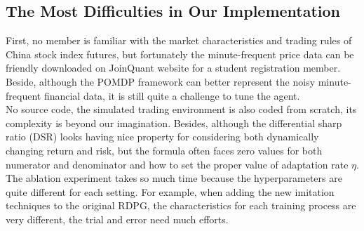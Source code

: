\subsection{The Most Difficulties in Our Implementation}
First, no member is familiar with the market characteristics and trading rules of China stock index futures, but fortunately the minute-frequent price data can be friendly downloaded on JoinQuant website for a student registration member. 
Beside, although the POMDP framework can better represent the noisy minute-frequent financial data, it is still quite a challenge to tune the agent. \\
No source code, the simulated trading environment is also coded from scratch, its complexity is beyond our imagination. Besides, although the differential sharp ratio (DSR) looks having nice property for considering both dynamically changing return and risk, but the formula often faces zero values for both numerator and denominator and how to set the proper value of adaptation rate $\eta$.\\
The ablation experiment takes so much time because the hyperparameters are quite different for each setting. For example, when adding the new imitation techniques to the original RDPG, the characteristics for each training process are very different, the trial and error need much efforts. \\





